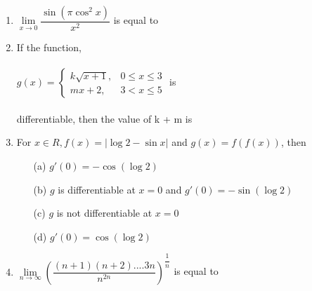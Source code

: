 \documentclass[journal,12pt,twocolumn]{IEEEtran}
\begin{document}
\begin{enumerate}
\item $\lim\limits_{x \to 0}\dfrac{\sin(\pi\cos^2x)}{x^2}$ is equal to
\begin{itemize}
\end{itemize}

\item If the function,\\ \\
$g(x)=\begin{cases}
k\sqrt{x+1}, &\text{$0\leq x \leq 3$}\\
mx+2, &\text{$3<x\leq 5$}
\end{cases}$ is \\ \\differentiable, then the value of k + m is
\begin{itemize}
\end{itemize}

\item For $x \in R, f(x)=|\log 2-\sin x|$ and $g(x)=f(f(x))$, then
\begin{itemize}
\item[(a)] $g'(0)=-\cos(\log 2)$
\item[(b)] $g$ is differentiable at $x=0$ and $g'(0)=-\sin(\log 2)$
\item[(c)] $g$ is not differentiable at $x=0$
\item[(d)] $g'(0)=\cos(\log 2)$
\end{itemize}

\item $\lim\limits_{n \to \infty}\left(\dfrac{(n+1)(n+2)....3n}{n^{2n}}\right)^{\dfrac{1}{n}}$ is equal to
\begin{itemize}
\end{itemize}


\end{enumerate}
\end{document}
